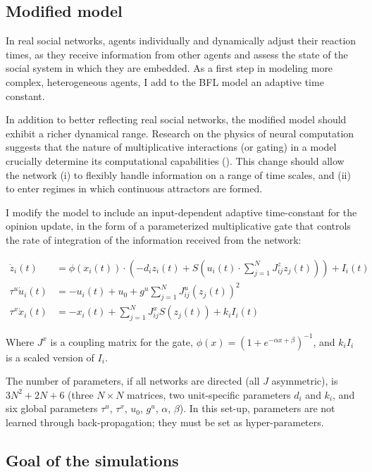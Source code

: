 \documentclass[]{article}
\begin{document}
\subsection{Modified model}

In real social networks, agents individually and dynamically adjust their reaction times, as they receive information from other agents and assess the state of the social system in which they are embedded. As a first step in modeling more complex, heterogeneous agents, I add to the BFL model an adaptive time constant.

In addition to better reflecting real social networks, the modified model should exhibit a richer dynamical range. Research on the physics of neural computation suggests that the nature of multiplicative interactions (or gating) in a model crucially determine its computational capabilities (\cite{krishnamurthyTheoryGatingRecurrent2022}). This change should allow the network (i) to flexibly handle information on a range of time scales, and (ii) to enter regimes in which continuous attractors are formed. 

I modify the model to include an input-dependent adaptive time-constant for the opinion update, in the form of a parameterized multiplicative gate that controls the rate of integration of the information received from the network:

\begin{align}
	\dot{z}_{i}(t) &= \phi \left( x_i(t) \right) \cdot \left( -d_{i}z_{i}(t) + S \left( u_i(t) \cdot  \sum^{N}_{j=1} J^z_{ij}z_{j}(t)  \right) \right) + I_{i}(t) \\
	\tau^u \dot{u}_i(t) &=  -u_i(t)+u_0+g^u \sum ^{N}_{j=1} J^u_{ij}(z_{j}(t))^2 \\
	\tau^x \dot{x}_i(t) &= -x_i(t) +  \sum ^{N}_{j=1} J^x_{ij} S(z_j(t)) + k_i I_i(t)
\end{align}

Where $J^x$ is a coupling matrix for the gate, $\phi (x) = (1 + e^{- \alpha x + \beta })^{-1}$, and $k_i I_i$ is a scaled version of $I_i$.

The number of parameters, if all networks are directed (all $J$ asymmetric), is $3 N^2 + 2N + 6$ (three $N \times N$ matrices, two unit-specific parameters $d_i$ and $k_i$, and six global parameters $\tau^u$, $\tau^x$, $u_0$, $g^u$, $\alpha$, $\beta$). In this set-up, parameters are not learned through back-propagation; they must be set as hyper-parameters. 

\subsection{Goal of the simulations}
\end{document}
